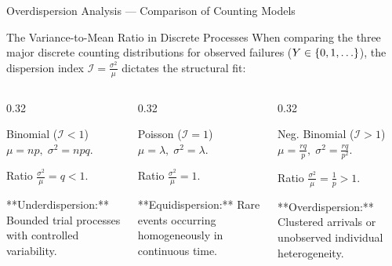 \documentclass[aspectratio=169,xcolor={dvipsnames,table}]{beamer}
\begin{document}
\begin{frame}{Overdispersion Analysis --- Comparison of Counting Models}
	\begin{block}{The Variance-to-Mean Ratio in Discrete Processes}
		\small
		When comparing the three major discrete counting distributions for observed failures ($Y \in \set{0, 1, \dots}$), the dispersion index $\mathcal{I} = \frac{\sigma^2}{\mu}$ dictates the structural fit:
	\end{block}
	\vspace{-0.1cm}
	\begin{columns}[T]
		\begin{column}{0.32\textwidth}
			\begin{exampleblock}{Binomial ($\mathcal{I} < 1$)}
				\footnotesize
				$\mu = np, \; \sigma^2 = npq$.
				
				Ratio $\frac{\sigma^2}{\mu} = q < 1$.
				
				**Underdispersion:** Bounded trial processes with controlled variability.
			\end{exampleblock}
		\end{column}
		\begin{column}{0.32\textwidth}
			\begin{block}{Poisson ($\mathcal{I} = 1$)}
				\footnotesize
				$\mu = \lambda, \; \sigma^2 = \lambda$.
				
				Ratio $\frac{\sigma^2}{\mu} = 1$.
				
				**Equidispersion:** Rare events occurring homogeneously in continuous time.
			\end{block}
		\end{column}
		\begin{column}{0.32\textwidth}
			\begin{alertblock}{Neg. Binomial ($\mathcal{I} > 1$)}
				\footnotesize
				$\mu = \frac{rq}{p}, \; \sigma^2 = \frac{rq}{p^2}$.
				
				Ratio $\frac{\sigma^2}{\mu} = \frac{1}{p} > 1$.
				
				**Overdispersion:** Clustered arrivals or unobserved individual heterogeneity.
			\end{alertblock}
		\end{column}
	\end{columns}
\end{frame}
\end{document}

